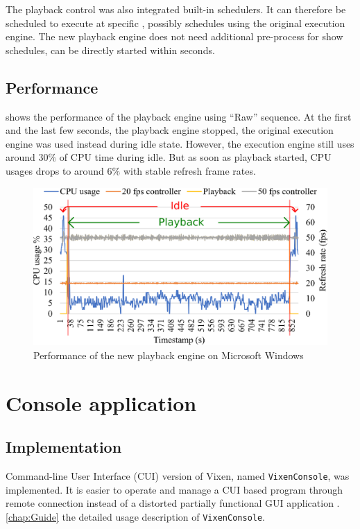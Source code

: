 The playback control was also integrated  built-in schedulers. It can therefore be scheduled to execute at specific , possibly  schedules using the original execution engine. The new playback engine does not need additional pre-process for show schedules,  can be directly started within seconds.

\subsection{Performance}

 shows the performance of the  playback engine  using  ``Raw'' sequence. At the first and the last few seconds, the playback engine stopped, the original execution engine was used instead during idle state. However, the execution engine still uses around $30 \%$ of CPU time during idle. But as soon as playback started, CPU usages drops to around $6 \%$ with stable refresh frame rates.

\begin{figure}[t]
  \centering
  \includegraphics[width=0.8\columnwidth]{Figs/playback.eps}
  \caption{\footnotesize Performance of the new playback engine on Microsoft Windows}
  \label{fig:playback}
\end{figure}

\section{Console application}

\subsection{Implementation}

 Command-line User Interface (CUI) version of Vixen, named \texttt{VixenConsole}, was implemented. It is easier to operate and manage a CUI based program through remote connection  instead of a distorted partially functional GUI application . \cref{chap:Guide}  the detailed usage description of \texttt{VixenConsole}.

